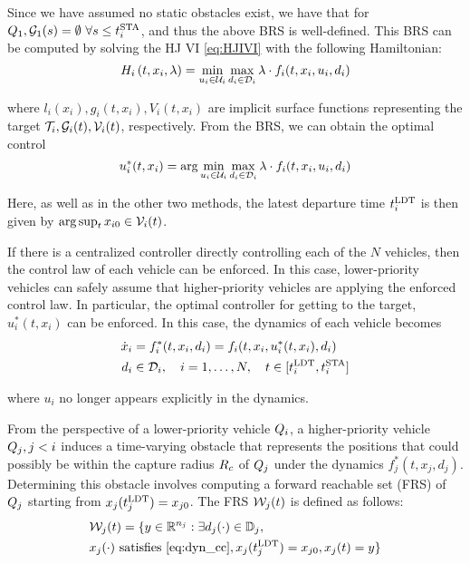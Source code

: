 Since we have assumed no static obstacles exist, we have that for $Q_1, \mathcal{G}_1(s)=\emptyset ~ \forall s \le t^\text{STA}_i$, and thus the above BRS is well-defined. This BRS can be computed by solving the HJ VI \eqref{eq:HJIVI} with the following Hamiltonian:
\vspace{-0.3em}
\begin{equation}
H_i\left(t, x_i, \lambda\right) = \min_{u_i \in \mathcal{U}_i} \max_{d_i \in \mathcal{D}_i} \lambda \cdot f_i(t, x_i, u_i, d_i)
\end{equation}

\noindent where $l_i(x_i), g_i(t,x_i),V_i(t,x_i)$ are implicit surface functions representing the target $\mathcal{T}_i, \mathcal{G}_i(t), \mathcal{V}_i(t)$, respectively. From the BRS, we can obtain the optimal control
\vspace{-0.3em}
\begin{equation}
\label{eq:opt_ctrl_i}
u_i^*(t,x_i) =  \arg \min_{u_i \in \mathcal{U}_i} \max_{d_i \in \mathcal{D}_i} \lambda \cdot f_i(t, x_i, u_i, d_i)
\end{equation}

Here, as well as in the other two methods, the latest departure time $t^\text{LDT}_i$ is then given by $\arg \sup_t x_{i0} \in \mathcal{V}_i(t)$.

If there is a centralized controller directly controlling each of the $N$ vehicles, then the control law of each vehicle can be enforced. In this case, lower-priority vehicles can safely assume that higher-priority vehicles are applying the enforced control law. In particular, the optimal controller for getting to the target, $u^*_i(t, x_i)$ can be enforced. In this case, the dynamics of each vehicle becomes 
\vspace{-0.3em}
\begin{equation}
\label{eq:dyn_cc}
\begin{aligned}
\dot x_i &= f^*_i (t, x_i, d_i) = f_i(t, x_i, u^*_i(t,x_i), d_i) \\
d_i &\in \mathcal{D}_i, \quad i = 1,\ldots, N, \quad t \in [t^\text{LDT}_i, t^\text{STA}_i]
\end{aligned}
\end{equation}

\noindent where $u_i$ no longer appears explicitly in the dynamics.

From the perspective of a lower-priority vehicle $Q_i$, a higher-priority vehicle $Q_j, j < i$ induces a time-varying obstacle that represents the positions that could possibly be within the capture radius $R_c$ of $Q_j$ under the dynamics $f^*_j(t, x_j, d_j)$. Determining this obstacle involves computing a forward reachable set (FRS) of $Q_j$ starting from $x_j(t^\text{LDT}_j) = x_{j0}$. The FRS $\mathcal{W}_j(t)$ is defined as follows:
\vspace{-0.3em}
\begin{equation}
\label{eq:FRS1}
\begin{aligned}
&\mathcal{W}_j(t) = \{y \in \mathbb{R}^{n_j}: \exists d_j(\cdot) \in \mathbb{D}_j, \\
&x_j(\cdot) \text{ satisfies \eqref{eq:dyn_cc}}, x_j(t^\text{LDT}_j) = x_{j0}, x_j(t) = y\}
\end{aligned}
\end{equation}

